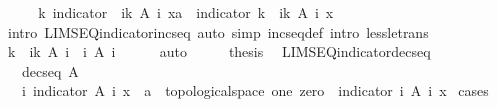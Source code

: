 \begin{isabellebody}
%
\isadelimproof
%
\endisadelimproof
%
\isatagproof
{}\isamarkupfalse%
\ {\isacharminus}\isanewline
\ \ \isamarkupfalse%
\ {\isachardoublequoteopen}{\isacharparenleft}{\isasymlambda}k{\isachardot}\ indicator\ {\isacharparenleft}{\isasymUnion}\ i{\isacharless}k{\isachardot}\ A\ i{\isacharparenright}\ x{\isacharcolon}{\isacharcolon}{\isacharprime}a{\isacharparenright}\ {\isacharminus}{\isacharminus}{\isacharminus}{\isacharminus}{\isachargreater}\ indicator\ {\isacharparenleft}{\isasymUnion}k{\isachardot}\ {\isasymUnion}\ i{\isacharless}k{\isachardot}\ A\ i{\isacharparenright}\ x{\isachardoublequoteclose}\isanewline
\ \ \ \ \isamarkupfalse%
\ {\isacharparenleft}intro\ LIMSEQ{\isacharunderscore}indicator{\isacharunderscore}incseq{\isacharparenright}\ {\isacharparenleft}auto\ simp{\isacharcolon}\ incseq{\isacharunderscore}def\ intro{\isacharcolon}\ less{\isacharunderscore}le{\isacharunderscore}trans{\isacharparenright}\isanewline
\ \ \isamarkupfalse%
\ \isamarkupfalse%
\ {\isachardoublequoteopen}{\isacharparenleft}{\isasymUnion}k{\isachardot}\ {\isasymUnion}\ i{\isacharless}k{\isachardot}\ A\ i{\isacharparenright}\ {\isacharequal}\ {\isacharparenleft}{\isasymUnion}i{\isachardot}\ A\ i{\isacharparenright}{\isachardoublequoteclose}\isanewline
\ \ \ \ \isamarkupfalse%
\ auto\isanewline
\ \ \isamarkupfalse%
\ \isamarkupfalse%
\ {\isacharquery}thesis\ \isacommand{{\isachardot}}\isamarkupfalse%
\isanewline
{}\isamarkupfalse%
%
\endisatagproof
{\isafoldproof}%
%
\isadelimproof
\isanewline
%
\endisadelimproof
\isanewline
{}\isamarkupfalse%
\ LIMSEQ{\isacharunderscore}indicator{\isacharunderscore}decseq{\isacharcolon}\isanewline
\ \ \ {\isachardoublequoteopen}decseq\ A{\isachardoublequoteclose}\isanewline
\ \ \ {\isachardoublequoteopen}{\isacharparenleft}{\isasymlambda}i{\isachardot}\ indicator\ {\isacharparenleft}A\ i{\isacharparenright}\ x\ {\isacharcolon}{\isacharcolon}\ {\isacharprime}a\ {\isacharcolon}{\isacharcolon}\ {\isacharbraceleft}topological{\isacharunderscore}space{\isacharcomma}\ one{\isacharcomma}\ zero{\isacharbraceright}{\isacharparenright}\ {\isacharminus}{\isacharminus}{\isacharminus}{\isacharminus}{\isachargreater}\ indicator\ {\isacharparenleft}{\isasymInter}i{\isachardot}\ A\ i{\isacharparenright}\ x{\isachardoublequoteclose}\isanewline
%
\isadelimproof
%
\endisadelimproof
%
\isatagproof
{}\isamarkupfalse%
\ cases\isanewline
\ \ \isamarkupfalse%

\end{isabellebody}
